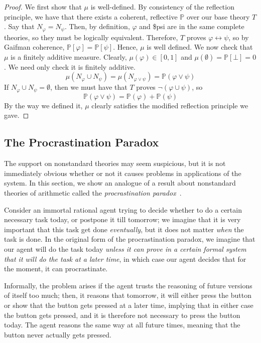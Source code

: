 \documentclass[12pt]{article}
\newcommand{\PP}{\mathbb{P}}
\newcommand{\vp}{\varphi}
\theoremstyle{plain}
\theoremstyle{definition}
\theoremstyle{remark}
\begin{document}
\begin{proof}
We first show that $\mu$ is well-defined. By consistency of the reflection principle, we have that there exists a coherent, reflective $\PP$ over our base theory $T$.
Say that $N_{\vp}=N_{\psi}$. Then, by definition, $\vp$ and \$psi are in the same complete theories, so they must be logically equivalent. Therefore, $T$ proves $\vp\leftrightarrow\psi$, so by Gaifman coherence, $\PP[\vp]=\PP[\psi]$. Hence, $\mu$ is well defined.
We now check that $\mu$ is a finitely additive measure. Clearly, $\mu(\vp)\in[0,1]$ and $\mu(\emptyset)=\PP[\bot]=0$.
We need only check it is finitely additive. 
$$\mu(N_{\vp}\cup N_{\psi})=\mu(N_{\vp\vee\psi})=\PP(\vp\vee\psi)$$
If $N_{\vp}\cup N_{\psi}=\emptyset$, then we must have that $T$ proves $\neg(\vp\cup\psi)$, so 
$$\PP(\vp\vee\psi)=\PP(\vp)+\PP(\psi)$$
By the way we defined it, $\mu$ clearly satisfies the modified reflection principle we gave.
\end{proof}
\subsection{The Procrastination Paradox}


The support on nonstandard theories may seem suspicious, but it is not immediately obvious whether or not it causes problems in applications of the system. In this section, we show an analogue of a result about nonstandard theories of arithmetic called the \emph{procrastination paradox}~\cite{yudkowsky13}. 

Consider an immortal rational agent trying to decide whether to do a certain necessary task today, or postpone it till tomorrow; we imagine that it is very important that this task get done \emph{eventually}, but it does not matter \emph{when} the task is done. In the original form of the procrastination paradox, we imagine that our agent will do the task today \emph{unless it can prove in a certain formal system that it will do the task at a later time}, in which case our agent decides that for the moment, it can procrastinate.

Informally, the problem arises if the agent trusts the reasoning of future versions of itself too much; then, it reasons that tomorrow, it will either press the button or show that the button gets pressed at a later time, implying that in either case the button gets pressed, and it is therefore not necessary to press the button today. The agent reasons the same way at all future times, meaning that the button never actually gets pressed.
\end{document}
